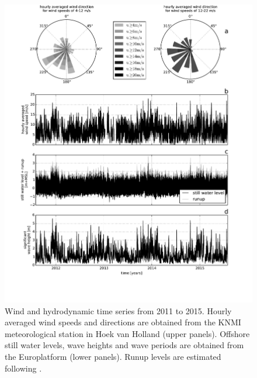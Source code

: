 \begin{figure}
  \centering
  \includegraphics[width=\columnwidth]{../Figures/boundaryconditions}
  \caption{Wind and hydrodynamic time series from 2011 to 2015. Hourly
    averaged wind speeds and directions are obtained from the KNMI
    meteorological station in Hoek van Holland (upper
    panels). Offshore still water levels, wave heights and wave
    periods are obtained from the Europlatform (lower panels). Runup
    levels are estimated following \citet{Stockdon2006}.}
  \label{fig:windwaves}
\end{figure}


